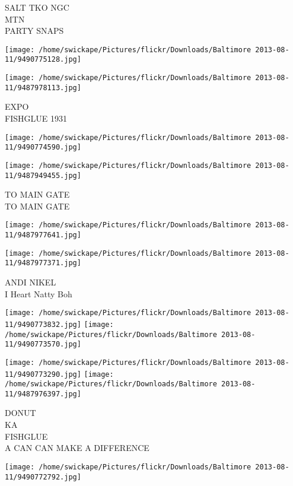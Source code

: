 \documentclass[10pt,letterpaper]{article}
\begin{document}
SALT TKO NGC\\
MTN\\
PARTY SNAPS\\
\pagebreak

\texttt{[image: /home/swickape/Pictures/flickr/Downloads/Baltimore 2013-08-11/9490775128.jpg]}

\vspace{0.25in}
\texttt{[image: /home/swickape/Pictures/flickr/Downloads/Baltimore 2013-08-11/9487978113.jpg]}

EXPO\\
FISHGLUE 1931\\
\pagebreak

\texttt{[image: /home/swickape/Pictures/flickr/Downloads/Baltimore 2013-08-11/9490774590.jpg]}

\vspace{0.25in}
\texttt{[image: /home/swickape/Pictures/flickr/Downloads/Baltimore 2013-08-11/9487949455.jpg]}

TO MAIN GATE\\
TO MAIN GATE\\
\pagebreak

\texttt{[image: /home/swickape/Pictures/flickr/Downloads/Baltimore 2013-08-11/9487977641.jpg]}

\vspace{0.25in}
\texttt{[image: /home/swickape/Pictures/flickr/Downloads/Baltimore 2013-08-11/9487977371.jpg]}

ANDI NIKEL\\
I Heart Natty Boh\\
\pagebreak

\texttt{[image: /home/swickape/Pictures/flickr/Downloads/Baltimore 2013-08-11/9490773832.jpg]}
\texttt{[image: /home/swickape/Pictures/flickr/Downloads/Baltimore 2013-08-11/9490773570.jpg]}

\texttt{[image: /home/swickape/Pictures/flickr/Downloads/Baltimore 2013-08-11/9490773290.jpg]}
\texttt{[image: /home/swickape/Pictures/flickr/Downloads/Baltimore 2013-08-11/9487976397.jpg]}

DONUT\\
KA\\
FISHGLUE\\
A CAN CAN MAKE A DIFFERENCE\\
\pagebreak

\texttt{[image: /home/swickape/Pictures/flickr/Downloads/Baltimore 2013-08-11/9490772792.jpg]}
\end{document}
